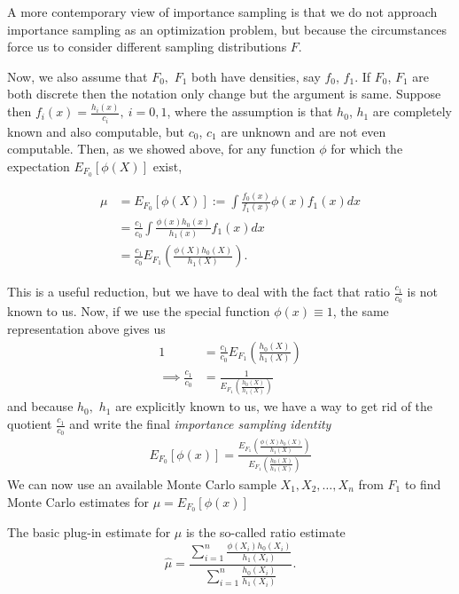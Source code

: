 A more contemporary view of importance sampling is that we do not approach
importance sampling as an optimization problem, but because the circumstances
force us to consider different sampling distributions $F$.

Now, we also assume that $F_0,$ $F_1$ both have densities, say $f_0$, $f_1$.
If $F_0$, $F_1$ are both discrete then the notation only change but the argument is same.
Suppose then $f_i(x)=\frac{h_i(x)}{c_i},\ i=0,1$, where the assumption is that $h_0$, $h_1$
are completely known and also computable, but $c_0$, $c_1$ are unknown and are not even computable.
Then, as we showed above, for any function $\phi$ for which the expectation $E_{F_0}[\phi(X)]$ exist,

\begin{align*}
	\mu & = E_{F_0}[\phi(X)] := \int \frac{f_0(x)}{f_1(x)}\phi(x)f_1(x)dx      \\
	    & =\frac{c_1}{c_0} \int \frac{\phi(x)h_0(x)}{h_1(x)}f_1(x)dx           \\
	    & =\frac{c_1}{c_0} E_{F_1}\left( \frac{\phi(X)h_0(X)}{h_1(X)} \right).
\end{align*}

This is a useful reduction, but we have to deal with the fact that ratio $\frac{c_1}{c_0}$
is not known to us. Now, if we use the special function $\phi(x)\equiv 1$, the same
representation above gives us
\begin{align*}
	1                        & = \frac{c_1}{c_0} E_{F_1} \left( \frac{h_0(X)}{h_1(X)} \right) \\
	\implies \frac{c_1}{c_0} & = \frac{1}{E_{F_1} \left( \frac{h_0(X)}{h_1(X)} \right)}
\end{align*}
and because $h_0,$ $h_1$ are explicitly known to us, we have a way to get rid of the
quotient $\frac{c_1}{c_0}$ and write the final \textit{importance sampling identity}
\begin{align*}
	E_{F_0}[\phi(x)] = \frac{E_{F_1}\left( \frac{\phi(X)h_0(X)}{h_1(X)} \right)}{E_{F_1} \left( \frac{h_0(X)}{h_1(X)} \right)}
\end{align*}
We can now use an available Monte Carlo sample $X_1,X_2,\ldots,X_n$ from $F_1$
to find Monte Carlo estimates for $\mu = E_{F_0}[\phi(x)]$

The basic plug-in estimate for $\mu$ is the so-called ratio estimate
\[
	\hat{\mu} = \frac{\sum_{i = 1}^{n}\frac{\phi(X_i)h_0(X_i)}{h_1(X_i)} }{\sum_{i = 1}^{n} \frac{h_0(X_i)}{h_1(X_i)}}.
\]

